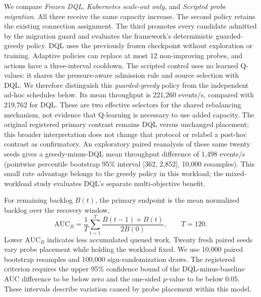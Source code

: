 We compare \emph{Frozen DQL}, \emph{Kubernetes scale-out only}, and
\emph{Scripted probe migration}. All three receive the same capacity increase.
The second policy retains the existing connection assignment. The third
promotes every candidate admitted by the migration guard and evaluates the
framework's deterministic guarded-greedy policy. DQL uses the previously frozen checkpoint
without exploration or training. Adaptive policies can replace at most 12
non-improving probes, and actions have a three-interval cooldown.
The scripted control uses no learned Q-values: it shares the pressure-aware
admission rule and source selection with DQL. We therefore distinguish this
\emph{guarded-greedy} policy from the independent ad-hoc schedules below.
Its mean throughput is 221,260 events/s, compared with 219,762 for DQL. These
are two effective selectors for the shared rebalancing mechanism, not evidence
that Q-learning is necessary to use added capacity. The original registered
primary contrast remains DQL versus unchanged placement; this broader
interpretation does not change that protocol or relabel a post-hoc contrast
as confirmatory. An exploratory paired reanalysis of these same twenty seeds
gives a greedy-minus-DQL mean throughput difference of 1,498 events/s
(pointwise percentile bootstrap 95\% interval [362, 2,852], 10,000 resamples).
This small rate advantage belongs to the greedy policy in this workload;
the mixed-workload study evaluates DQL's separate multi-objective benefit.

For remaining backlog $B(t)$, the primary endpoint is the mean normalized
backlog over the recovery window,
\begin{equation}
 \mathrm{AUC}_B=\frac{1}{T}\sum_{t=1}^{T}
 \frac{B(t-1)+B(t)}{2B(0)},\qquad T=120.
 \label{eq:scaleout-backlog-auc}
\end{equation}
Lower $\mathrm{AUC}_B$ indicates less accumulated queued work. Twenty fresh paired seeds
vary probe placement while holding the workload fixed. We use 10,000 paired
bootstrap resamples and 100,000 sign-randomization draws. The registered
criterion requires the upper 95\% confidence bound of the DQL-minus-baseline
AUC difference to be below zero and the one-sided $p$-value to be below 0.05.
These intervals describe variation caused by probe placement within this model.

